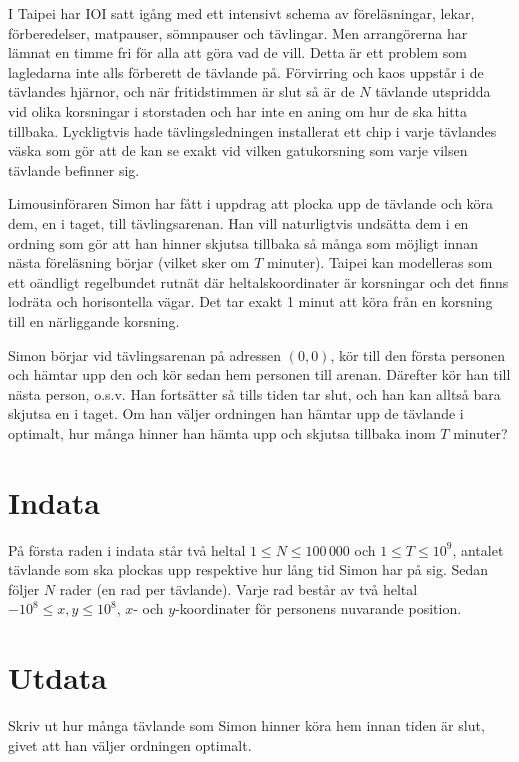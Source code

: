 
I Taipei har IOI satt igång med ett intensivt schema av föreläsningar, lekar,
förberedelser, matpauser, sömnpauser och tävlingar. Men arrangörerna har lämnat
en timme fri för alla att göra vad de vill. Detta är ett problem som lagledarna
inte alls förberett de tävlande på. Förvirring och kaos uppstår i de tävlandes
hjärnor, och när fritidstimmen är slut så är de $N$ tävlande utspridda vid
olika korsningar i storstaden och har inte en aning om hur de ska hitta
tillbaka. Lyckligtvis hade tävlingsledningen installerat ett chip i varje
tävlandes väska som gör att de kan se exakt vid vilken gatukorsning som varje
vilsen tävlande befinner sig.

Limousinföraren Simon har fått i uppdrag att plocka upp de tävlande och köra
dem, en i taget, till tävlingsarenan. Han vill naturligtvis undsätta dem i en
ordning som gör att han hinner skjutsa tillbaka så många som möjligt innan
nästa föreläsning börjar (vilket sker om $T$ minuter). Taipei kan modelleras
som ett oändligt regelbundet rutnät där heltalskoordinater är korsningar och
det finns lodräta och horisontella vägar. Det tar exakt 1 minut att köra från
en korsning till en närliggande korsning.

Simon börjar vid tävlingsarenan på adressen $(0, 0)$, kör till den första
personen och hämtar upp den och kör sedan hem personen till arenan. Därefter
kör han till nästa person, o.s.v. Han fortsätter så tills tiden tar slut, och
han kan alltså bara skjutsa en i taget. Om han väljer ordningen han hämtar upp
de tävlande i optimalt, hur många hinner han hämta upp och skjutsa tillbaka
inom $T$ minuter?

\section*{Indata}
På första raden i indata står två heltal $1 \leq N \leq 100\,000$ och $1 \leq T
\leq 10^9$, antalet tävlande som ska plockas upp respektive hur lång tid Simon
har på sig. Sedan följer $N$ rader (en rad per tävlande). Varje rad består av
två heltal $-10^8 \leq x, y \leq 10^8$, $x$- och $y$-koordinater för personens
nuvarande position.

\section*{Utdata}
Skriv ut hur många tävlande som Simon hinner köra hem innan tiden är slut,
givet att han väljer ordningen optimalt.


